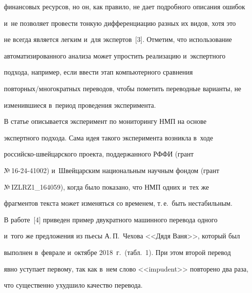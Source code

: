финансовых ресурсов, но он, как правило, не дает подробного описания ошибок 


и~не позволяет провести тонкую дифференциацию разных их видов, хотя это 


не всегда является легким и~для экспертов~[3]. Отметим, что использование 


автоматизированного анализа может упростить реализацию и~экспертного 


подхода, например, если ввести этап компьютерного сравнения 


повторных/многократных переводов, чтобы пометить переводные варианты, не 


изменившиеся в~период проведения эксперимента.


  


  В статье описывается эксперимент по мониторингу НМП на основе 


экспертного подхода. Сама идея такого эксперимента возникла в~ходе 


российско-швей\-цар\-ско\-го проекта, поддержанного РФФИ (грант 


№\,16-24-41002) и~Швейцарским национальным научным фондом (грант 


№\,IZLRZ1\_164059), когда было показано, что НМП одних и~тех же 


фрагментов текста может изменяться со временем, т.\,е.\ быть нестабильным.


  


  В работе~[4] приведен пример двукратного машинного перевода одного 


и~того же предложения из пьесы А.\,П.~Чехова <<Дядя Ваня>>, который был 


выполнен в~феврале и~октябре 2018~г.\ (табл.~1). При этом второй перевод 


явно уступает первому, так как в~нем слово <<impudent>> повторено два раза, 


что существенно ухудшило качество перевода.


  


